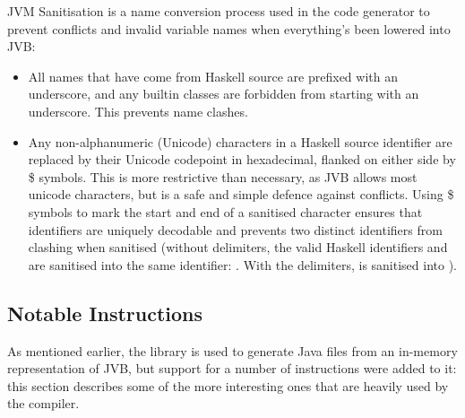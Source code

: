 \documentclass[dissertation.tex]{subfiles}
\begin{document}
{{        JVM Sanitisation is a name conversion process used in the code generator to prevent conflicts and invalid
        variable names when everything's been lowered into JVB:

        \begin{itemize}
        \item
        {

            All names that have come from Haskell source are prefixed with an underscore, and any builtin classes
            are forbidden from starting with an underscore. This prevents name clashes.

        }
        \item
        {

            Any non-alphanumeric (Unicode) characters in a Haskell source identifier are replaced by their Unicode
            codepoint in hexadecimal, flanked on either side by \$ symbols. This is more restrictive than necessary,
            as JVB allows most unicode characters, but is a safe and simple defence against conflicts. Using \$
            symbols to mark the start and end of a sanitised character ensures that identifiers are uniquely
            decodable and prevents two distinct identifiers from clashing when sanitised (without delimiters, the
            valid Haskell identifiers \haskell{#\(\pi\)#} and  are sanitised into the same identifier:
            . With the delimiters, \haskell{#\(\pi\)#} is sanitised into ).

        }
        \end{itemize}

    }
    \subsection{Notable Instructions}
    {

        As mentioned earlier, the  library is used to generate Java  files from
        an in-memory representation of JVB, but support for a number of instructions were added to it: this section
        describes some of the more interesting ones that are heavily used by the compiler.
        
        \subsubsection{}
        {
            
}}}
\end{document}
